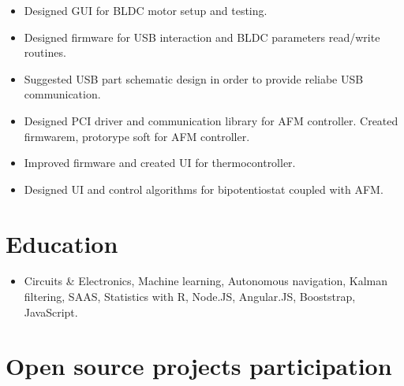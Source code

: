 \documentclass{sb_cv}
\begin{document}
\begin{itemize}
\item Designed GUI for BLDC motor setup and testing.
\item Designed firmware for USB interaction and BLDC parameters read/write routines.
\item Suggested USB part schematic design in order to provide reliabe USB communication.
\end{itemize}

\begin{itemize}
\item Designed PCI driver and communication library for AFM controller. Created firmwarem, protorype soft for AFM controller.
\item Improved firmware and created UI for thermocontroller.
\item Designed UI and control algorithms for bipotentiostat coupled with AFM.
\end{itemize}


\section{Education}
\begin{itemize}
\item Circuits \& Electronics, Machine learning, Autonomous navigation, Kalman filtering, SAAS, Statistics with R, Node.JS, Angular.JS, Booststrap, JavaScript.
\end{itemize}

\section{Open source projects participation}
\end{document}
